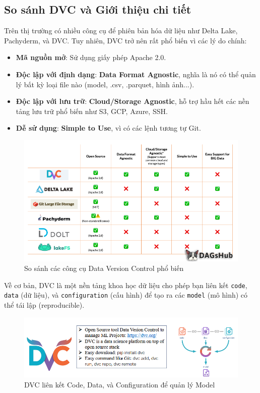\documentclass[11pt]{article}
\begin{document}
\subsection{So sánh DVC và Giới thiệu chi tiết}
Trên thị trường có nhiều công cụ để phiên bản hóa dữ liệu như Delta Lake, Pachyderm, và DVC. Tuy nhiên, DVC trở nên rất phổ biến vì các lý do chính:
\begin{itemize}
    \item \textbf{Mã nguồn mở}: Sử dụng giấy phép Apache 2.0.
    \item \textbf{Độc lập với định dạng}: \textbf{Data Format Agnostic}, nghĩa là nó có thể quản lý bất kỳ loại file nào (model, .csv, .parquet, hình ảnh...).
    \item \textbf{Độc lập với lưu trữ}: \textbf{Cloud/Storage Agnostic}, hỗ trợ hầu hết các nền tảng lưu trữ phổ biến như S3, GCP, Azure, SSH.
    \item \textbf{Dễ sử dụng}: \textbf{Simple to Use}, vì có các lệnh tương tự Git.
\end{itemize}

\begin{figure}[H]
    \centering
    \includegraphics[width=0.7\linewidth]{images/dv_soft.png}
    \caption{So sánh các công cụ Data Version Control phổ biến}
\end{figure}

Về cơ bản, DVC là một nền tảng khoa học dữ liệu cho phép bạn liên kết \texttt{code}, \texttt{data} (dữ liệu), và \texttt{configuration} (cấu hình) để tạo ra các \texttt{model} (mô hình) có thể tái lập (reproducible).

\begin{figure}[H]
    \centering
    \includegraphics[width=0.7\linewidth]{images/what_dvc.png}
    \caption{DVC liên kết Code, Data, và Configuration để quản lý Model}
\end{figure}
\end{document}
